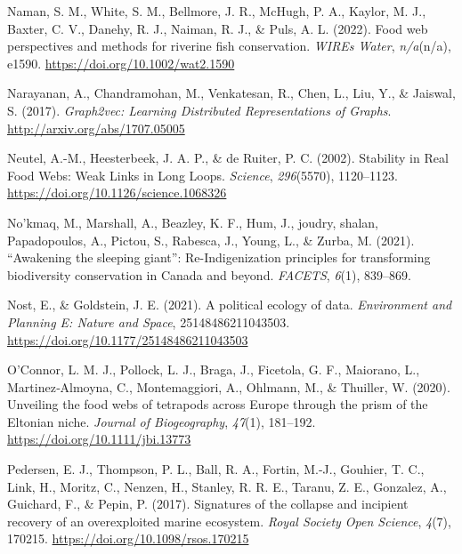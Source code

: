 \documentclass[11pt]{article}
\newlength{\cslhangindent}
\newenvironment{CSLReferences}[2] %
 {%
  \setlength{\parindent}{0pt}
  \ifodd #1 \everypar{\setlength{\hangindent}{\cslhangindent}}\ignorespaces\fi
  \ifnum #2 > 0
  \setlength{\parskip}{#2\baselineskip}
  \fi
 }%
 {}
\begin{document}
\begin{CSLReferences}{1}{0}
\leavevmode{}%
Naman, S. M., White, S. M., Bellmore, J. R., McHugh, P. A., Kaylor, M.
J., Baxter, C. V., Danehy, R. J., Naiman, R. J., \& Puls, A. L. (2022).
Food web perspectives and methods for riverine fish conservation.
\emph{WIREs Water}, \emph{n/a}(n/a), e1590.
\url{https://doi.org/10.1002/wat2.1590}

\leavevmode{}%
Narayanan, A., Chandramohan, M., Venkatesan, R., Chen, L., Liu, Y., \&
Jaiswal, S. (2017). \emph{Graph2vec: Learning Distributed
Representations of Graphs}. \url{http://arxiv.org/abs/1707.05005}

\leavevmode{}%
Neutel, A.-M., Heesterbeek, J. A. P., \& de Ruiter, P. C. (2002).
Stability in Real Food Webs: Weak Links in Long Loops. \emph{Science},
\emph{296}(5570), 1120--1123.
\url{https://doi.org/10.1126/science.1068326}

\leavevmode{}%
No'kmaq, M., Marshall, A., Beazley, K. F., Hum, J., joudry, shalan,
Papadopoulos, A., Pictou, S., Rabesca, J., Young, L., \& Zurba, M.
(2021). {``Awakening the sleeping giant''}: Re-Indigenization principles
for transforming biodiversity conservation in Canada and beyond.
\emph{FACETS}, \emph{6}(1), 839--869.

\leavevmode{}%
Nost, E., \& Goldstein, J. E. (2021). A political ecology of data.
\emph{Environment and Planning E: Nature and Space}, 25148486211043503.
\url{https://doi.org/10.1177/25148486211043503}

\leavevmode{}%
O'Connor, L. M. J., Pollock, L. J., Braga, J., Ficetola, G. F.,
Maiorano, L., Martinez‐Almoyna, C., Montemaggiori, A., Ohlmann, M., \&
Thuiller, W. (2020). Unveiling the food webs of tetrapods across Europe
through the prism of the Eltonian niche. \emph{Journal of Biogeography},
\emph{47}(1), 181--192. \url{https://doi.org/10.1111/jbi.13773}

\leavevmode{}%
Pedersen, E. J., Thompson, P. L., Ball, R. A., Fortin, M.-J., Gouhier,
T. C., Link, H., Moritz, C., Nenzen, H., Stanley, R. R. E., Taranu, Z.
E., Gonzalez, A., Guichard, F., \& Pepin, P. (2017). Signatures of the
collapse and incipient recovery of an overexploited marine ecosystem.
\emph{Royal Society Open Science}, \emph{4}(7), 170215.
\url{https://doi.org/10.1098/rsos.170215}


\end{CSLReferences}
\end{document}
